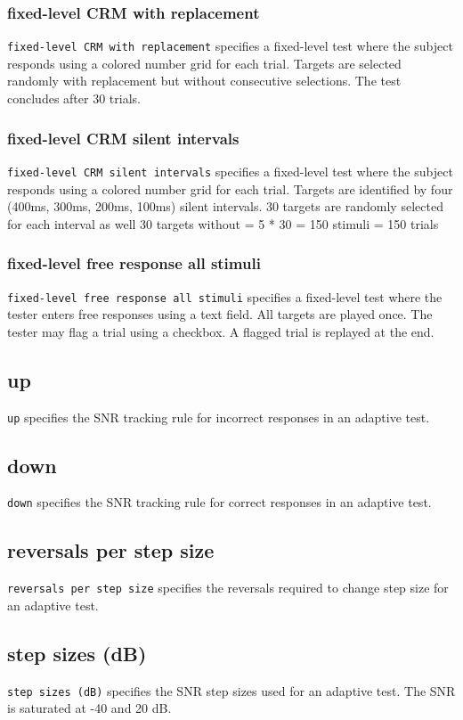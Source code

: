 \documentclass[11pt,pdftex,letterpaper]{article}
\begin{document}
\subsubsection{fixed-level CRM with replacement}
\texttt{fixed-level CRM with replacement} specifies a fixed-level test where the subject responds using a colored number grid for each trial. Targets are selected randomly with replacement but without consecutive selections. The test concludes after 30 trials.
\subsubsection{fixed-level CRM silent intervals}
\texttt{fixed-level CRM silent intervals} specifies a fixed-level test where the subject responds using a colored number grid for each trial. Targets are identified by four (400ms, 300ms, 200ms, 100ms) silent intervals. 30 targets are randomly selected for each interval as well 30 targets without = 5 * 30 = 150 stimuli = 150 trials
\subsubsection{fixed-level free response all stimuli}
\texttt{fixed-level free response all stimuli} specifies a fixed-level test where the tester enters free responses using a text field. All targets are played once. The tester may flag a trial using a checkbox. A flagged trial is replayed at the end.
\subsection{up}
\texttt{up} specifies the SNR tracking rule for incorrect responses in an adaptive test.
\subsection{down}
\texttt{down} specifies the SNR tracking rule for correct responses in an adaptive test.
\subsection{reversals per step size}
\texttt{reversals per step size} specifies the reversals required to change step size for an adaptive test.
\subsection{step sizes (dB)}
\texttt{step sizes (dB)} specifies the SNR step sizes used for an adaptive test. The SNR is saturated at -40 and 20 dB.
\end{document}
